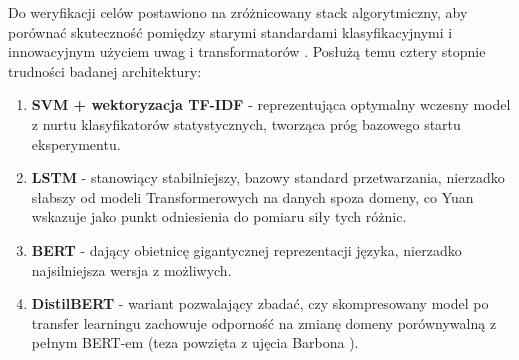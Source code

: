 \documentclass[runningheads]{llncs}
\begin{document}
Do weryfikacji celów postawiono na zróżnicowany stack algorytmiczny, aby porównać skuteczność pomiędzy starymi standardami klasyfikacyjnymi i innowacyjnym użyciem uwag i transformatorów \cite{DBLP:journals/corr/abs-1109-6341,s22218184}. Posłużą temu cztery stopnie trudności badanej architektury:
\begin{enumerate}
    \item \textbf{SVM + wektoryzacja TF-IDF} - reprezentująca optymalny wczesny model z nurtu klasyfikatorów statystycznych, tworząca próg bazowego startu eksperymentu.
    \item \textbf{LSTM} - stanowiący stabilniejszy, bazowy standard przetwarzania, nierzadko słabszy od modeli Transformerowych na danych spoza domeny, co Yuan \cite{Yuan2026EmpiricalSO} wskazuje jako punkt odniesienia do pomiaru siły tych różnic.
    \item \textbf{BERT} - dający obietnicę gigantycznej reprezentacji języka, nierzadko najsilniejsza wersja z możliwych.
    \item \textbf{DistilBERT} - wariant pozwalający zbadać, czy skompresowany model po transfer learningu zachowuje odporność na zmianę domeny porównywalną z pełnym BERT-em (teza powzięta z ujęcia Barbona \cite{s22218184}).
\end{enumerate}



\end{document}
